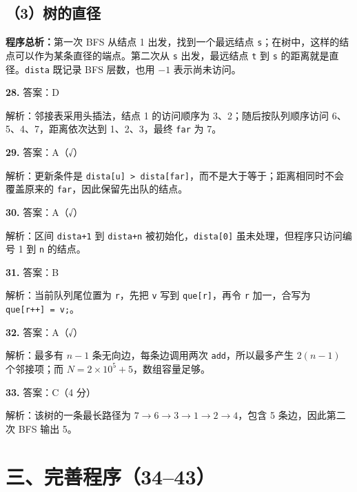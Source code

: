 \documentclass[a4paper]{ctexart}
\newcommand{\ans}[2]{\noindent\textbf{#1} \quad 答案：#2\par}
\newcommand{\expn}[1]{\hspace*{1.5em} 解析：#1\par}
\newcommand{\overview}[1]{\par\smallskip\noindent\textbf{程序总析：}#1\par\smallskip}
\begin{document}
\subsection*{（3）树的直径}
\overview{第一次 BFS 从结点 1 出发，找到一个最远结点 \texttt{s}；在树中，这样的结点可以作为某条直径的端点。第二次从 \texttt{s} 出发，最远结点 \texttt{t} 到 \texttt{s} 的距离就是直径。\texttt{dista} 既记录 BFS 层数，也用 $-1$ 表示尚未访问。}
\begin{center}
\quad{}
\end{center}
\ans{28.}{D}\expn{邻接表采用头插法，结点 1 的访问顺序为 3、2；随后按队列顺序访问 6、5、4、7，距离依次达到 1、2、3，最终 \texttt{far} 为 7。}
\ans{29.}{A（√）}\expn{更新条件是 \texttt{dista[u] > dista[far]}，而不是大于等于；距离相同时不会覆盖原来的 \texttt{far}，因此保留先出队的结点。}
\ans{30.}{A（√）}\expn{区间 \texttt{dista+1} 到 \texttt{dista+n} 被初始化，\texttt{dista[0]} 虽未处理，但程序只访问编号 1 到 \texttt{n} 的结点。}
\ans{31.}{B}\expn{当前队列尾位置为 \texttt{r}，先把 \texttt{v} 写到 \texttt{que[r]}，再令 \texttt{r} 加一，合写为 \texttt{que[r++] = v;}。}
\ans{32.}{A（√）}\expn{最多有 $n-1$ 条无向边，每条边调用两次 \texttt{add}，所以最多产生 $2(n-1)$ 个邻接项；而 $N=2\times10^5+5$，数组容量足够。}
\ans{33.}{C（4 分）}\expn{该树的一条最长路径为 $7\to6\to3\to1\to2\to4$，包含 5 条边，因此第二次 BFS 输出 5。}

\section*{三、完善程序（34--43）}
\end{document}
